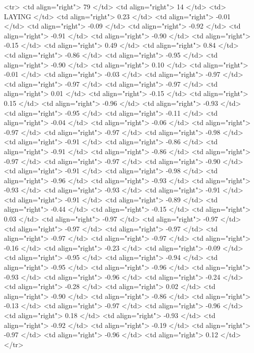  <tr> <td align="right"> 79 </td> <td align="right">  14 </td> <td> LAYING </td> <td align="right"> 0.23 </td> <td align="right"> -0.01 </td> <td align="right"> -0.09 </td> <td align="right"> -0.92 </td> <td align="right"> -0.91 </td> <td align="right"> -0.90 </td> <td align="right"> -0.15 </td> <td align="right"> 0.49 </td> <td align="right"> 0.84 </td> <td align="right"> -0.86 </td> <td align="right"> -0.95 </td> <td align="right"> -0.90 </td> <td align="right"> 0.10 </td> <td align="right"> -0.01 </td> <td align="right"> -0.03 </td> <td align="right"> -0.97 </td> <td align="right"> -0.97 </td> <td align="right"> -0.97 </td> <td align="right"> 0.01 </td> <td align="right"> -0.15 </td> <td align="right"> 0.15 </td> <td align="right"> -0.96 </td> <td align="right"> -0.93 </td> <td align="right"> -0.95 </td> <td align="right"> -0.11 </td> <td align="right"> -0.04 </td> <td align="right"> -0.06 </td> <td align="right"> -0.97 </td> <td align="right"> -0.97 </td> <td align="right"> -0.98 </td> <td align="right"> -0.91 </td> <td align="right"> -0.86 </td> <td align="right"> -0.91 </td> <td align="right"> -0.86 </td> <td align="right"> -0.97 </td> <td align="right"> -0.97 </td> <td align="right"> -0.90 </td> <td align="right"> -0.91 </td> <td align="right"> -0.98 </td> <td align="right"> -0.96 </td> <td align="right"> -0.93 </td> <td align="right"> -0.93 </td> <td align="right"> -0.93 </td> <td align="right"> -0.91 </td> <td align="right"> -0.91 </td> <td align="right"> -0.89 </td> <td align="right"> -0.44 </td> <td align="right"> -0.15 </td> <td align="right"> 0.03 </td> <td align="right"> -0.97 </td> <td align="right"> -0.97 </td> <td align="right"> -0.97 </td> <td align="right"> -0.97 </td> <td align="right"> -0.97 </td> <td align="right"> -0.97 </td> <td align="right"> -0.16 </td> <td align="right"> -0.23 </td> <td align="right"> -0.09 </td> <td align="right"> -0.95 </td> <td align="right"> -0.94 </td> <td align="right"> -0.95 </td> <td align="right"> -0.96 </td> <td align="right"> -0.93 </td> <td align="right"> -0.96 </td> <td align="right"> -0.24 </td> <td align="right"> -0.28 </td> <td align="right"> 0.02 </td> <td align="right"> -0.90 </td> <td align="right"> -0.86 </td> <td align="right"> -0.13 </td> <td align="right"> -0.97 </td> <td align="right"> -0.96 </td> <td align="right"> 0.18 </td> <td align="right"> -0.93 </td> <td align="right"> -0.92 </td> <td align="right"> -0.19 </td> <td align="right"> -0.97 </td> <td align="right"> -0.96 </td> <td align="right"> 0.12 </td> </tr>
